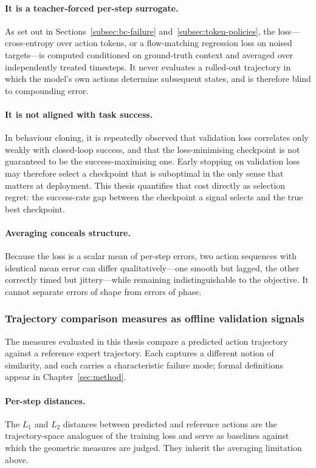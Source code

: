 \documentclass[english,12pt,a4paper,pdftex,elec,utf8]{aaltothesis}
\begin{document}
\paragraph{It is a teacher-forced per-step surrogate.}
As set out in Sections~\ref{subsec:bc-failure} and~\ref{subsec:token-policies}, the loss---cross-entropy over action tokens, or a flow-matching regression loss on noised targets---is computed conditioned on ground-truth context and averaged over independently treated timesteps. It never evaluates a rolled-out trajectory in which the model's own actions determine subsequent states, and is therefore blind to compounding error.

\paragraph{It is not aligned with task success.}
In behaviour cloning, it is repeatedly observed that validation loss correlates only weakly with closed-loop success, and that the loss-minimising checkpoint is not guaranteed to be the success-maximising one. Early stopping on validation loss may therefore select a checkpoint that is suboptimal in the only sense that matters at deployment. This thesis quantifies that cost directly as selection regret: the success-rate gap between the checkpoint a signal selects and the true best checkpoint.

\paragraph{Averaging conceals structure.}
Because the loss is a scalar mean of per-step errors, two action sequences with identical mean error can differ qualitatively---one smooth but lagged, the other correctly timed but jittery---while remaining indistinguishable to the objective. It cannot separate errors of shape from errors of phase.

\subsubsection{Trajectory comparison measures as offline validation signals}
\label{subsec:metrics}

The measures evaluated in this thesis compare a predicted action trajectory against a reference expert trajectory. Each captures a different notion of similarity, and each carries a characteristic failure mode; formal definitions appear in Chapter~\ref{sec:method}.

\paragraph{Per-step distances.}
The $L_1$ and $L_2$ distances between predicted and reference actions are the trajectory-space analogues of the training loss and serve as baselines against which the geometric measures are judged. They inherit the averaging limitation above.
\end{document}
